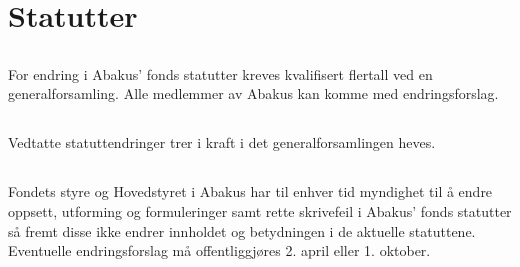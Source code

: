 \section{Statutter}

\subsection{}
For endring i Abakus’ fonds statutter kreves kvalifisert flertall ved en
generalforsamling. Alle medlemmer av Abakus kan komme med endringsforslag.

\subsection{}
Vedtatte statuttendringer trer i kraft i det generalforsamlingen heves.

\subsection{}
Fondets styre og Hovedstyret i Abakus har til enhver tid myndighet til å endre oppsett, utforming og formuleringer samt rette skrivefeil i Abakus' fonds statutter så fremt disse ikke endrer innholdet og betydningen i de aktuelle statuttene. Eventuelle endringsforslag må offentliggjøres 2. april eller 1. oktober.

